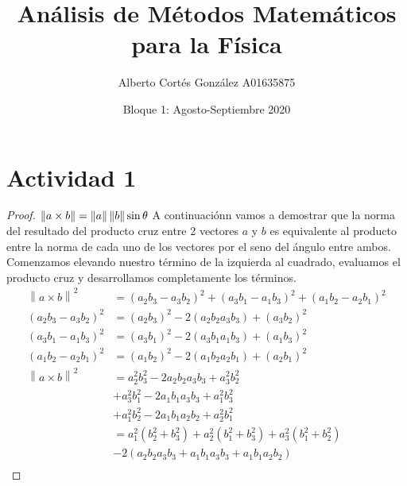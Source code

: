\documentclass{article}
\title{Análisis de Métodos Matemáticos para la Física}
\author{Alberto Cortés González \quad A01635875}
\date{Bloque 1: Agosto-Septiembre 2020}
\newcommand{\norm}[1]{\left\lVert#1\right\rVert}
\begin{document}
\maketitle

\section{Actividad 1}
\begin{proof}
$\norm{a\times b} = \norm{a}\norm{b}\sin\theta \\$
A continuaciónn vamos a demostrar que la norma del resultado del producto cruz entre 2 vectores $a$ y $b$ es equivalente al producto entre la norma de cada uno de los vectores por el seno del ángulo entre ambos.\\

Comenzamos elevando nuestro término de la izquierda al cuadrado, evaluamos el producto cruz y desarrollamos completamente los términos.
\begin{equation*}
    \begin{split}
        \norm{a\times b}^2  &= (a_{2}b_{3} - a_{3}b_{2})^2 + (a_{3}b_{1} - a_{1}b_{3})^2 + (a_{1}b_{2} - a_{2}b_{1})^2\\
        (a_{2}b_{3} - a_{3}b_{2})^2 &= (a_{2}b_{3})^2 - 2(a_{2}b_{2}a_{3}b_{3}) + (a_{3}b_{2})^2 \\
        (a_{3}b_{1} - a_{1}b_{3})^2 &= (a_{3}b_{1})^2 - 2(a_{3}b_{1}a_{1}b_{3}) + (a_{1}b_{3})^2 \\
        (a_{1}b_{2} - a_{2}b_{1})^2 &= (a_{1}b_{2})^2 - 2(a_{1}b_{2}a_{2}b_{1}) + (a_{2}b_{1})^2 \\
        \norm{a\times b}^2  &= a_{2}^2b_{3}^2 - 2a_{2}b_{2}a_{3}b_{3} + a_{3}^2b_{2}^2 \\
        &+ a_{3}^2b_{1}^2 - 2a_{1}b_{1}a_{3}b_{3} + a_{1}^2b_{3}^2 \\
        &+ a_{1}^2b_{2}^2 - 2a_{1}b_{1}a_{2}b_{2} + a_{2}^2b_{1}^2 \\
        &= a_{1}^2(b_{2}^2+b_{3}^2)+a_{2}^2(b_{1}^2+b_{3}^2)+a_{3}^2(b_{1}^2+b_{2}^2)\\
        &- 2(a_{2}b_{2}a_{3}b_{3}+a_{1}b_{1}a_{3}b_{3}+a_{1}b_{1}a_{2}b_{2}) \\
    \end{split}
\end{equation*}


\end{proof}
\end{document}
